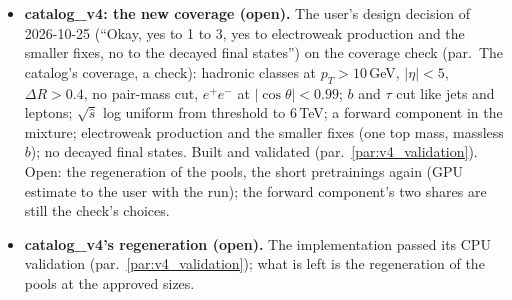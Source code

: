 \documentclass[11pt]{article}
\newcommand{\code}[1]{\texttt{#1}}
\begin{document}
\begin{itemize}
    census (D100: $+Z$, $+H$ on every $2\to3$ class, quark and lepton pairs on every $2\to2$): $1586$ distinct tree classes
    ($65$, $321$, $1200$ at $2\to2$, $2\to3$, $2\to4$). $1127$ train; H3 $237$ (every class with an external top); H2
    $168$ ($54$ of $361$ families, a class held out when any of its members' parents is); H1 $54$ (no H2 parent among
    them). One-loop layer $150$: every coloured $2\to2$ class and $2\to3$ ones drawn per beam (a $2\to3$ MadLoop pool
    costs $100$--$200$ LO units); $121$ train, $29$ held out (H5). Heavy-quark layer $105$ pools: every $2\to2$ top
    class, $5$ at $2\to3$ and $23$ at $2\to4$, each at $50$, $300$, $600$ GeV. The removal twin drops the $\tau$, $\nu_\tau$
    and the quartic gauge family, in every layer: $151$ training pools ($136$ with a $\tau$ or $\nu_\tau$, H3p; $15$ on a quartic-gauge class, H4), $1246$ left (\code{recipes/make\_catalog\_v3\_recipes.py}). The held-out loop-induced class, drawn with the selection's seed among the $17$: $gg\to ZH$. Generation estimate from catalog\_v2's $6$ CPU-h for $478$
    entries: $100$ to $150$ core-hours, $3$ to $4$ h of wall on one $48$-core node, no GPU; approved (D102) and generated.
  \item \textbf{catalog\_v4: the new coverage (open).} The user's design decision of 2026-10-25 (``Okay, yes to 1 to 3,
    yes to electroweak production and the smaller fixes, no to the decayed final states'') on the coverage check (par.\
    The catalog's coverage, a check): hadronic classes at $p_T>10$\,GeV, $|\eta|<5$, $\Delta R>0.4$, no pair-mass cut,
    $e^+e^-$ at $|\cos\theta|<0.99$; $b$ and $\tau$ cut like jets and leptons; $\sqrt{\hat s}$ log uniform from
    threshold to $6$\,TeV; a forward component in the mixture; electroweak production and the smaller fixes (one top
    mass, massless $b$); no decayed final states. Built and validated (par.~\ref{par:v4_validation}). Open: the regeneration of the pools, the short pretrainings again (GPU estimate to the user with the run); the
    forward component's two shares are still the check's choices.
  \item \textbf{catalog\_v4's regeneration (open).} The implementation passed its CPU validation (par.~\ref{par:v4_validation}); what is left is the regeneration of the pools at the approved sizes.

\end{itemize}
\end{document}
